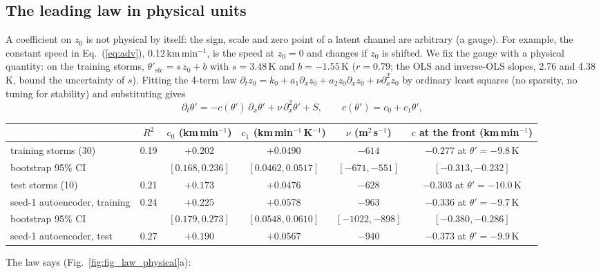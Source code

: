 \documentclass[11pt]{article}
\newcommand{\dx}{\partial_x}
\begin{document}
\subsection{The leading law in physical units}\label{sec:units}
A coefficient on $z_0$ is not physical by itself: the sign, scale and zero point of a latent channel are arbitrary (a gauge). For example, the constant speed in Eq.~(\ref{eq:adv}), 0.12\,km\,min$^{-1}$, is the speed at $z_0 = 0$ and changes if $z_0$ is shifted. We fix the gauge with a physical quantity: on the training storms, $\theta'_\mathrm{sfc} = s\, z_0 + b$ with $s = 3.48$\,K and $b = -1.55$\,K ($r = 0.79$; the OLS and inverse-OLS slopes, 2.76 and 4.38\,K, bound the uncertainty of $s$). Fitting the 4-term law $\partial_t z_0 = k_0 + a_1 \dx z_0 + a_2 z_0 \dx z_0 + \nu \partial_x^2 z_0$ by ordinary least squares (no sparsity, no tuning for stability) and substituting gives
\begin{equation}
\partial_t \theta' = -c(\theta')\, \dx\theta' + \nu\, \partial_x^2 \theta' + S, \qquad c(\theta') = c_0 + c_1 \theta',
\end{equation}
\begin{center}\small
\begin{tabular}{lccccc}\toprule
 & $R^2$ & $c_0$ (km\,min$^{-1}$) & $c_1$ (km\,min$^{-1}$\,K$^{-1}$) & $\nu$ (m$^2$\,s$^{-1}$) & $c$ at the front (km\,min$^{-1}$)\\\midrule
training storms (30) & 0.19 & $+0.202$ & $+0.0490$ & $-614$ & $-0.277$ at $\theta' = -9.8$\,K\\
bootstrap 95\% CI & & $[0.168, 0.236]$ & $[0.0462, 0.0517]$ & $[-671, -551]$ & $[-0.313, -0.232]$\\
test storms (10) & 0.21 & $+0.173$ & $+0.0476$ & $-628$ & $-0.303$ at $\theta' = -10.0$\,K\\\midrule
seed-1 autoencoder, training & 0.24 & $+0.225$ & $+0.0578$ & $-963$ & $-0.336$ at $\theta' = -9.7$\,K\\
bootstrap 95\% CI & & $[0.179, 0.273]$ & $[0.0548, 0.0610]$ & $[-1022, -898]$ & $[-0.380, -0.286]$\\
seed-1 autoencoder, test & 0.27 & $+0.190$ & $+0.0567$ & $-940$ & $-0.373$ at $\theta' = -9.9$\,K\\\bottomrule
\end{tabular}\end{center}
The law says (Fig.~\ref{fig:fig_law_physical}a):
\end{document}
